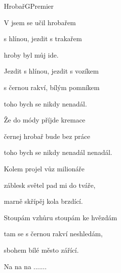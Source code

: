 \setcounter{page}{30}
\begin{song}{Hrobař}{G}{Premier}

\begin{SBVerse}

V  jsem se učil hrobařem

 s hlínou, jezdit s trakařem

 hroby byl můj ide.

\end{SBVerse}

\begin{SBVerse}

Jezdit s hlínou, jezdit s vozíkem

s černou rakví, bílým pomníkem

toho bych se nikdy nenadál.

\end{SBVerse}

\begin{SBVerse}

Že do módy příjde kremace

černej hrobař bude bez práce

toho bych se nikdy nenadál nenadál.

\end{SBVerse}

\begin{SBVerse}

Kolem projel vůz milionáře

záblesk světel pad mi do tváře,

marně skřípěj kola brzdící.

\end{SBVerse}

\begin{SBVerse}

Stoupám vzhůru stoupám ke hvězdám

tam se s černou rakví neshledám,

sbohem bílé město zářící.

\end{SBVerse}

\begin{SBVerse}

Na na na .......

\end{SBVerse}

\end{song}

\pagebreak
